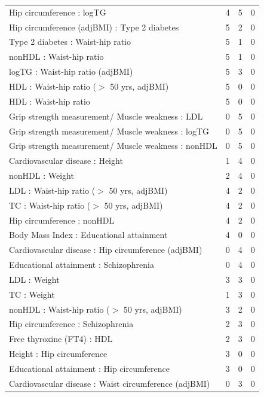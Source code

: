 \begin{table}[ht]
\begin{tabular}{lrrr}
  Hip circumference  : logTG &   4 &   5 &   0 \\ 
  Hip circumference (adjBMI) : Type 2 diabetes &   5 &   2 &   0 \\ 
  Type 2 diabetes : Waist-hip ratio  &   5 &   1 &   0 \\ 
  nonHDL : Waist-hip ratio  &   5 &   1 &   0 \\ 
  logTG : Waist-hip ratio (adjBMI) &   5 &   3 &   0 \\ 
  HDL : Waist-hip ratio ($>$ 50 yrs, adjBMI) &   5 &   0 &   0 \\ 
  HDL : Waist-hip ratio  &   5 &   0 &   0 \\ 
  Grip strength measurement/ Muscle weakness : LDL &   0 &   5 &   0 \\ 
  Grip strength measurement/ Muscle weakness : logTG &   0 &   5 &   0 \\ 
  Grip strength measurement/ Muscle weakness : nonHDL &   0 &   5 &   0 \\ 
  Cardiovascular disease : Height  &   1 &   4 &   0 \\ 
  nonHDL : Weight  &   2 &   4 &   0 \\ 
  LDL : Waist-hip ratio ($>$ 50 yrs, adjBMI) &   4 &   2 &   0 \\ 
  TC : Waist-hip ratio ($>$ 50 yrs, adjBMI) &   4 &   2 &   0 \\ 
  Hip circumference  : nonHDL &   4 &   2 &   0 \\ 
  Body Mass Index  : Educational attainment &   4 &   0 &   0 \\ 
  Cardiovascular disease : Hip circumference (adjBMI) &   0 &   4 &   0 \\ 
  Educational attainment : Schizophrenia &   0 &   4 &   0 \\ 
  LDL : Weight  &   3 &   3 &   0 \\ 
  TC : Weight  &   1 &   3 &   0 \\ 
  nonHDL : Waist-hip ratio ($>$ 50 yrs, adjBMI) &   3 &   2 &   0 \\ 
  Hip circumference  : Schizophrenia &   2 &   3 &   0 \\ 
  Free thyroxine (FT4) : HDL &   2 &   3 &   0 \\ 
  Height  : Hip circumference  &   3 &   0 &   0 \\ 
  Educational attainment : Hip circumference  &   3 &   0 &   0 \\ 
  Cardiovascular disease : Waist circumference (adjBMI) &   0 &   3 &   0 \\ 

\end{tabular}
\end{table}
